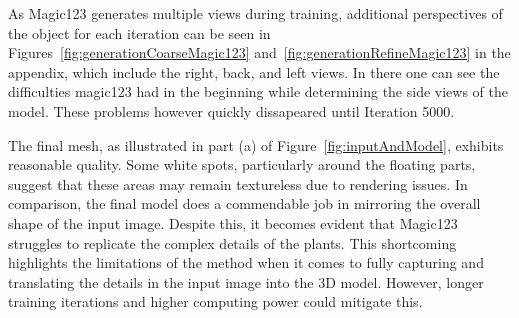 As Magic123 generates multiple views during training, additional perspectives of the object for each iteration can be seen in Figures~\ref{fig:generationCoarseMagic123} and~\ref{fig:generationRefineMagic123} in the appendix, which include the right, back, and left views. In there one can see the difficulties magic123 had in the beginning while determining the side views of the model. These problems however quickly dissapeared until Iteration 5000. 

The final mesh, as illustrated in part (a) of Figure~\ref{fig:inputAndModel}, exhibits reasonable quality. Some white spots, particularly around the floating parts, suggest that these areas may remain textureless due to rendering issues. In comparison, the final model does a commendable job in mirroring the overall shape of the input image. Despite this, it becomes evident that Magic123 struggles to replicate the complex details of the plants. This shortcoming highlights the limitations of the method when it comes to fully capturing and translating the details in the input image into the 3D model. However, longer training iterations and higher computing power could mitigate this.

